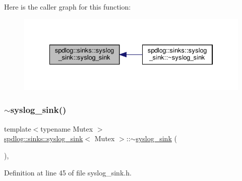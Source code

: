 Here is the caller graph for this function\+:
\nopagebreak
\begin{figure}[H]
\begin{center}
\leavevmode
\includegraphics[width=334pt]{classspdlog_1_1sinks_1_1syslog__sink_acc60de632a07b329aeba41ee48ced4f6_icgraph}
\end{center}
\end{figure}
\mbox{\label{classspdlog_1_1sinks_1_1syslog__sink_ae440dafe6eca68065ac0b6438761ac38}} 
\subsubsection{\texorpdfstring{$\sim$syslog\+\_\+sink()}{~syslog\_sink()}}
{\footnotesize\ttfamily template$<$typename Mutex $>$ \\
\hyperlink{classspdlog_1_1sinks_1_1syslog__sink}{spdlog\+::sinks\+::syslog\+\_\+sink}$<$ Mutex $>$\+::$\sim$\hyperlink{classspdlog_1_1sinks_1_1syslog__sink}{syslog\+\_\+sink} (\begin{DoxyParamCaption}{ }\end{DoxyParamCaption})\hspace{0.3cm}{\ttfamily [inline]}, {\ttfamily [override]}}



Definition at line 45 of file syslog\+\_\+sink.\+h.

